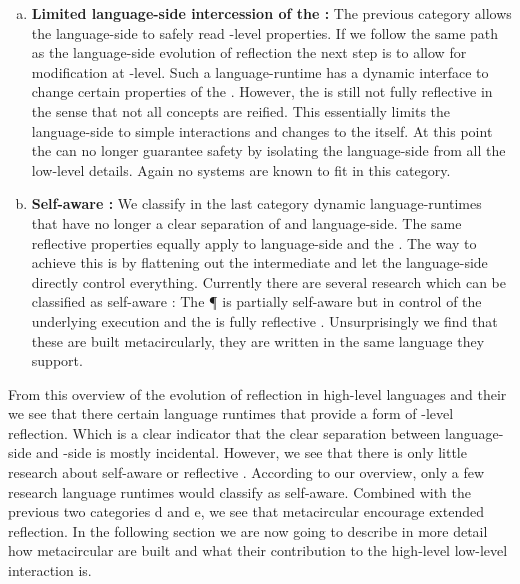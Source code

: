 \begin{enumerate}[a)]
\item \textbf{Limited language-side intercession of the \VM:}
	The previous category allows the language-side to safely read \VM-level properties.
	If we follow the same path as the language-side evolution of reflection the next step is to allow for modification at \VM-level.
	Such a language-runtime has a dynamic interface to change certain properties of the \VM.
	However, the \VM is still not fully reflective in the sense that not all \VM concepts are reified.
	This essentially limits the language-side to simple interactions and changes to the \VM itself.
	At this point the \VM can no longer guarantee safety by isolating the language-side from all the low-level details.
	Again no systems are known to fit in this category.
	
\item \textbf{Self-aware \VM:}
	We classify in the last category dynamic language-runtimes that have no longer a clear separation of \VM and language-side.
	The same reflective properties equally apply to language-side and the \VM.
	The way to achieve this is by flattening out the intermediate \VM and let the language-side directly control everything.
	Currently there are several research \VMs which can be classified as self-aware \VMs: The \P \VM \cite{Verw12a} is partially self-aware but in control of the underlying execution and the \Klein \VM is fully reflective \cite{Unga05a}. 
	Unsurprisingly we find that these \VMs are built metacircularly, they are written in the same language they support.
\end{enumerate}

From this overview of the evolution of reflection in high-level languages and their \VMs we see that there certain language runtimes that provide a form of \VM-level reflection.
Which is a clear indicator that the clear separation between language-side and \VM-side is mostly incidental.
However, we see that there is only little research about self-aware \VMs or reflective \VMs.
According to our overview, only a few research language runtimes would classify as self-aware.
Combined with the previous two categories d and e, we see that metacircular \VMs encourage extended reflection.
In the following section we are now going to describe in more detail how metacircular \VMs are built and what their contribution to the high-level low-level interaction is.



